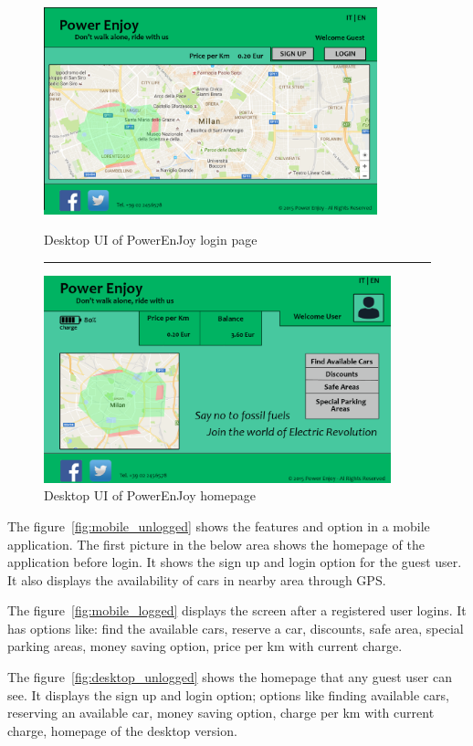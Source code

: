 \begin{figure}[t]
	\centering
	\includegraphics[height=6cm,keepaspectratio]{figures/desktop_unlogged.eps}
	\caption{Desktop UI of PowerEnJoy login page}
	\label{fig:desktop_unlogged}
	\textcolor{white}{\rule{\textwidth}{0cm}}
	\includegraphics[height=6cm,keepaspectratio]{figures/desktop_logged.eps}
	\caption{Desktop UI of PowerEnJoy homepage}
	\label{fig:desktop_logged}
\end{figure}
The figure~\ref{fig:mobile_unlogged} shows the features and option in a mobile application. The first picture in the below area shows the homepage of the application before login. It shows the sign up and login option for the guest user. It also displays the availability of cars in nearby area through GPS.

The figure~\ref{fig:mobile_logged} displays the screen after a registered user logins. It has options like: find the available cars, reserve a car, discounts, safe area,	special parking areas, money saving option, price per km with current charge.

The figure~\ref{fig:desktop_unlogged} shows the homepage that any guest user can see. It displays the sign up and login option; options like finding available cars, reserving an available car, money saving option, charge per km with current charge, homepage of the desktop version.

